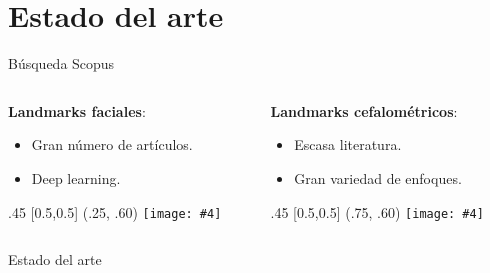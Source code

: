 \documentclass[aspectratio=43]{beamer}
\renewcommand{\cite}[1]{\footnote<.->[frame]{\fullcite{#1}}}
\newcommand{\absimage}[4][0.5,0.5]{%
	\begin{textblock}{#3}%
		[#1]%
		(#2)%
		\texttt{[image: \#4]}%
\end{textblock}}
\begin{document}
\section{Estado del arte}

\begin{frame}[t]{Búsqueda Scopus}

  \begin{columns}[onlytextwidth]
    \begin{column}{.5\textwidth}
      \textbf{Landmarks faciales}:
      \begin{itemize}
        \item Gran número de artículos.
        \item Deep learning.
      \end{itemize}
      \absimage{.25, .60}{.45}{imgs/Scopus_1.png}
    \end{column}
    \begin{column}{.5\textwidth}
      \textbf{Landmarks cefalométricos}:
      \begin{itemize}
        \item Escasa literatura. \item Gran variedad de enfoques.
      \end{itemize}
      \absimage{.75, .60}{.45}{imgs/Scopus_2.png}
    \end{column}
  \end{columns}
\end{frame}

\begin{frame}[t]{Estado del arte}

\end{frame}
\end{document}

